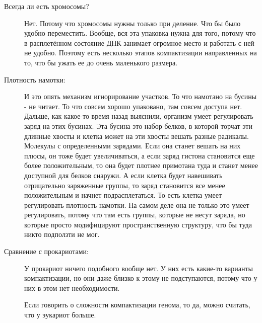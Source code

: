 \begin{description}
\item[Всегда ли есть хромосомы?] 
Нет. Потому что хромосомы нужны только при деление. 
Что бы было удобно переместить. Вообще, вся эта упаковка нужна 
для того, потому что в расплетённом состояние ДНК занимает огромное 
место и работать с ней не удобно. Поэтому есть несколько 
этапов компактизации направленных на то, 
что бы ужать ее до очень маленького размера. 

\item[Плотность намотки:]
И это опять механизм игнорирование участков. То что намотано на бусины - не читает. 
То что совсем хорошо упаковано, там совсем доступа нет. Дальше, как какое-то 
время назад выяснили, организм умеет регулировать заряд на 
этих бусинах. Эта бусина это набор белков, 
в которой торчат эти длинные хвосты и клетка может на эти хвосты вешать 
разные радикалы. Молекулы с определенными зарядами. Если она станет 
вешать на них плюсы, он тоже будет увеличиваться, 
а если заряд гистона становится еще более положительным, то она будет 
плотнее примотана туда и станет менее доступной для белков снаружи. 
А если клетка будет навешивать отрицательно 
заряженные группы, то заряд становится все 
менее положительным и начнет подрасплетаться. То есть 
клетка умеет регулировать плотность намотки. 
На самом деле она не только это умеет регулировать, 
потому что там есть группы, которые не несут заряда, но 
которые просто модифицируют пространственную 
структуру, что бы туда никто подползти не мог. 


\item[Сравнение с прокариотами:]
У прокариот ничего подобного вообще нет. У них есть какие-то варианты 
компактизации, но они даже близко к этому не подступаются, 
потому что у них в этом нет необходимости. 

Если говорить о сложности компактизации генома, то да, 
можно считать, что у эукариот больше.  
\end{description}

